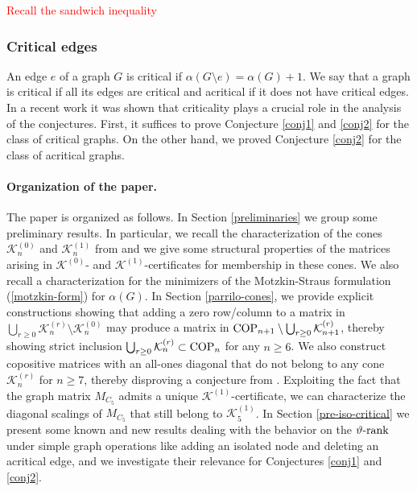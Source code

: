 \documentclass[11pt]{article}
\numberwithin{equation}{section}
\newcommand{\COP}{{\text{\rm COP}}}
\newcommand{\MK}{{\mathcal K}}
\newcommand{\rrank}{\vartheta\text{\rm -rank}}
\newcommand{\MoL}{\textcolor{red}}
\begin{document}
{\MoL{Recall the sandwich inequality}

\subsubsection*{Critical edges}
An edge $e$ of a graph $G$ is critical if $\alpha(G\setminus e)=\alpha(G)+1$. We say that a graph is critical if all its edges are critical and acritical if it does not have critical edges. In a recent work it was shown that criticality plays a crucial role in the analysis of the conjectures. First, it suffices to prove Conjecture \ref{conj1} and \ref{conj2} for the class of critical graphs. On the other hand, we proved Conjecture \ref{conj2} for the class of acritical graphs. 
}

\paragraph*{Organization of the paper.}
The paper is organized as follows. In Section \ref{preliminaries} we group some preliminary results. In particular, we recall the characterization of the cones $\MK_n^{(0)}$ and $\MK_n^{(1)}$ from \cite{Parrilo-thesis-2000} and we give some structural properties of the matrices  arising in $\mathcal K^{(0)}$- and $\mathcal K^{(1)}$-certificates for  membership in these cones. 
We also  recall a characterization for the minimizers of the Motzkin-Straus formulation  (\ref{motzkin-form}) for $\alpha(G)$.
In Section \ref{parrilo-cones}, we  provide explicit constructions showing that adding a zero row/column to a matrix in $\bigcup_{r\ge 0}\MK^{(r)}_n\setminus \mathcal K^{(0)}_n$ may produce a matrix in $\COP_{n+1}\setminus \bigcup_{r\ge 0} \MK^{(r)}_{n+1}$, thereby showing strict  inclusion $\bigcup_{r\ge 0}\MK^{(r)}_n \subset \COP_n$ for any $n\ge 6$.
We also construct copositive matrices with an all-ones diagonal that do not belong to any cone $\MK^{(r)}_n$ for $n\ge 7$, thereby disproving a conjecture from \cite{DDGH}. Exploiting the fact that the graph matrix $M_{C_5}$ admits a unique $\mathcal K^{(1)}$-certificate, we can characterize the diagonal scalings of  $M_{C_5}$ that still belong to $\mathcal K^{(1)}_5$.
 In Section \ref{pre-iso-critical} we present some known and new results dealing with the behavior on the $\rrank$ under  simple graph operations like adding an isolated node and deleting an acritical edge, and we investigate their relevance for Conjectures \ref{conj1} and  \ref{conj2}.
\end{document}
